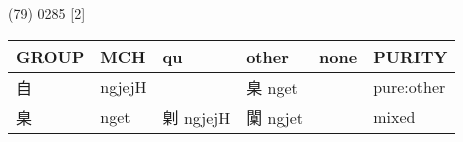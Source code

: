\documentclass[14pt,a4paper]{scrartcl}
\begin{document}
(79) 0285 {[}2{]}

\begin{longtable}[c]{@{}llllll@{}}
\toprule
\begin{minipage}[b]{0.14\columnwidth}\raggedright\strut
GROUP
\strut\end{minipage} &
\begin{minipage}[b]{0.14\columnwidth}\raggedright\strut
MCH
\strut\end{minipage} &
\begin{minipage}[b]{0.14\columnwidth}\raggedright\strut
qu
\strut\end{minipage} &
\begin{minipage}[b]{0.14\columnwidth}\raggedright\strut
other
\strut\end{minipage} &
\begin{minipage}[b]{0.14\columnwidth}\raggedright\strut
none
\strut\end{minipage} &
\begin{minipage}[b]{0.14\columnwidth}\raggedright\strut
PURITY
\strut\end{minipage}\tabularnewline
\midrule
\endhead
\begin{minipage}[t]{0.14\columnwidth}\raggedright\strut
自
\strut\end{minipage} &
\begin{minipage}[t]{0.14\columnwidth}\raggedright\strut
ngjejH
\strut\end{minipage} &
\begin{minipage}[t]{0.14\columnwidth}\raggedright\strut
\strut\end{minipage} &
\begin{minipage}[t]{0.14\columnwidth}\raggedright\strut
臬 nget
\strut\end{minipage} &
\begin{minipage}[t]{0.14\columnwidth}\raggedright\strut
\strut\end{minipage} &
\begin{minipage}[t]{0.14\columnwidth}\raggedright\strut
pure:other
\strut\end{minipage}\tabularnewline
\begin{minipage}[t]{0.14\columnwidth}\raggedright\strut
臬
\strut\end{minipage} &
\begin{minipage}[t]{0.14\columnwidth}\raggedright\strut
nget
\strut\end{minipage} &
\begin{minipage}[t]{0.14\columnwidth}\raggedright\strut
㓷 ngjejH
\strut\end{minipage} &
\begin{minipage}[t]{0.14\columnwidth}\raggedright\strut
闑 ngjet
\strut\end{minipage} &
\begin{minipage}[t]{0.14\columnwidth}\raggedright\strut
\strut\end{minipage} &
\begin{minipage}[t]{0.14\columnwidth}\raggedright\strut
mixed
\strut\end{minipage}\tabularnewline
\bottomrule
\end{longtable}
\end{document}
